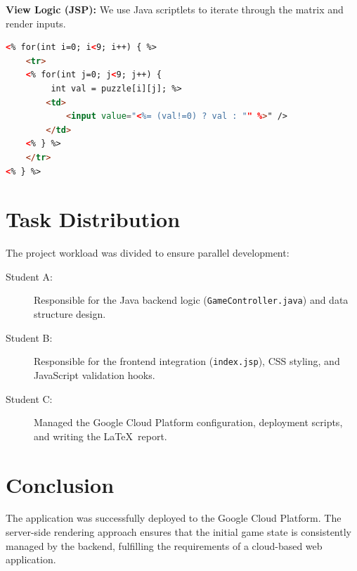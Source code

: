 \documentclass{article}
\begin{document}
\textbf{View Logic (JSP):}
We use Java scriptlets to iterate through the matrix and render inputs.
\begin{lstlisting}[language=HTML, basicstyle=\ttfamily\small, breaklines=true, frame=single]
<% for(int i=0; i<9; i++) { %>
    <tr>
    <% for(int j=0; j<9; j++) { 
         int val = puzzle[i][j]; %>
        <td>
            <input value="<%= (val!=0) ? val : "" %>" />
        </td>
    <% } %>
    </tr>
<% } %>
\end{lstlisting}

\section{Task Distribution}
The project workload was divided to ensure parallel development:

\begin{description}
    \item[Student A:] Responsible for the Java backend logic (\texttt{GameController.java}) and data structure design.
    \item[Student B:] Responsible for the frontend integration (\texttt{index.jsp}), CSS styling, and JavaScript validation hooks.
    \item[Student C:] Managed the Google Cloud Platform configuration, deployment scripts, and writing the \LaTeX\ report.
\end{description}

\section{Conclusion}
The application was successfully deployed to the Google Cloud Platform. The server-side rendering approach ensures that the initial game state is consistently managed by the backend, fulfilling the requirements of a cloud-based web application.
\end{document}
